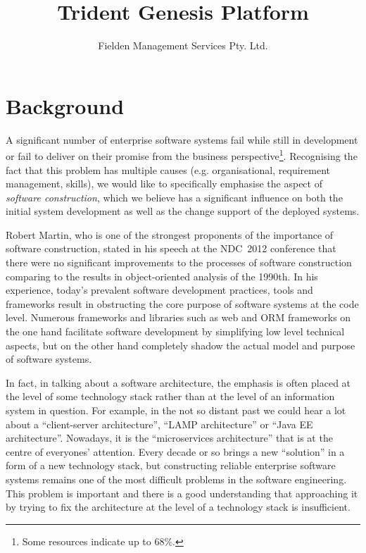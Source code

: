 \documentclass[a4paper,12pt,oneside,openright,final]{memoir} %
\title{Trident Genesis Platform}
\author{Fielden Management Services Pty. Ltd.}
\date{}
\begin{document}
\maketitle
{}


\onehalfspacing


\section*{Background}

	A significant number of enterprise software systems fail while still in development or fail to deliver on their promise from the business perspective\footnote{Some resources indicate up to 68\%.}.  
  	Recognising the fact that this problem has multiple causes (e.g. organisational, requirement management, skills), we would like to specifically emphasise the aspect of \emph{software construction}, which we believe has a significant influence on both the initial system development as well as the change support of the deployed systems.  
  
  	Robert Martin, who is one of the strongest proponents of the importance of software construction, stated in his speech at the NDC~2012 conference that there were no significant improvements to the processes of software construction comparing to the results in object-oriented analysis of the 1990th. 
  	In his experience, today's prevalent software development practices, tools and frameworks result in obstructing the core purpose of software systems at the code level.
  	Numerous frameworks and libraries such as web and ORM frameworks on the one hand facilitate software development by simplifying low level technical aspects, but on the other hand completely shadow the actual model and purpose of software systems.  
  	
	In fact, in talking about a software architecture, the emphasis is often placed at the level of some technology stack rather than at the level of an information system in question.
	For example, in the not so distant past we could hear a lot about a ``client-server architecture'', ``LAMP architecture'' or ``Java EE architecture''.
	Nowadays, it is the ``microservices architecture'' that is at the centre of everyones' attention.
	Every decade or so brings a new ``solution'' in a form of a new technology stack, but constructing reliable enterprise software systems remains one of the most difficult problems in the software engineering.	
	This problem is important and there is a good understanding that approaching it by trying to fix the architecture at the level of a technology stack is insufficient.
\end{document}
